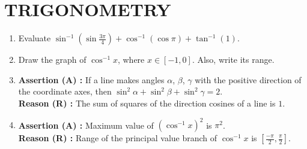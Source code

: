 \documentclass{article}
\begin{document}
\section{TRIGONOMETRY}
\begin{enumerate}
\item Evaluate $\sin^{-1}(\sin\frac{3\pi}{4}) + \cos^{-1}(\cos \pi) + \tan^{-1}(1)$.	

\item Draw the graph of $\cos^{-1} x$, where $x \in [-1, 0]$. Also, write its range.	
\item \textbf{Assertion (A) :} If a line makes angles $\alpha$, $\beta$, $\gamma$ with the positive direction of the coordinate axes, then $\sin^2 \alpha + \sin^2 \beta + \sin^2 \gamma = 2$. \\
	\textbf{Reason (R) :} The sum of squares of the direction cosines of a line is $1$.
\item \textbf{Assertion (A) :} Maximum value of $(\cos^{-1} x)^2$ is $\pi ^2$.\\
	\textbf{Reason (R) :} Range of the principal value branch of $\cos ^{-1} x$  is  $[\frac{-\pi}{2},\frac{\pi}{2}]$.

\end{enumerate}
\end{document}
